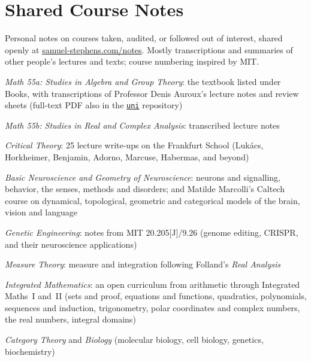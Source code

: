 \documentclass[11pt,letterpaper]{report} %
\begin{document}
    \section*{Shared Course Notes}
    Personal notes on courses taken, audited, or followed out of interest, shared openly at \href{https://www.samuel-stephens.com/notes}{samuel-stephens.com/notes}. Mostly transcriptions and summaries of other people's lectures and texts; course numbering inspired by MIT.
    \begin{tablist}
        \item[2025--26] \tab{}\textit{Math 55a: Studies in Algebra and Group Theory}: the textbook listed under Books, with transcriptions of Professor Denis Auroux's lecture notes and review sheets (full-text PDF also in the \href{https://github.com/sdvstephens/uni}{\texttt{uni}} repository)
        \item[2026]     \tab{}\textit{Math 55b: Studies in Real and Complex Analysis}: transcribed lecture notes
        \item[2026]     \tab{}\textit{Critical Theory}: 25 lecture write-ups on the Frankfurt School (Luk\'acs, Horkheimer, Benjamin, Adorno, Marcuse, Habermas, and beyond)
        \item[2026]     \tab{}\textit{Basic Neuroscience and Geometry of Neuroscience}: neurons and signalling, behavior, the senses, methods and disorders; and Matilde Marcolli's Caltech course on dynamical, topological, geometric and categorical models of the brain, vision and language
        \item[2026]     \tab{}\textit{Genetic Engineering}: notes from MIT 20.205[J]/9.26 (genome editing, CRISPR, and their neuroscience applications)
        \item[ongoing]  \tab{}\textit{Measure Theory}: measure and integration following Folland's \textit{Real Analysis}
        \item[ongoing]  \tab{}\textit{Integrated Mathematics}: an open curriculum from arithmetic through Integrated Maths~I and~II (sets and proof, equations and functions, quadratics, polynomials, sequences and induction, trigonometry, polar coordinates and complex numbers, the real numbers, integral domains)
        \item[ongoing]  \tab{}\textit{Category Theory} and \textit{Biology} (molecular biology, cell biology, genetics, biochemistry)
    \end{tablist}
\end{document}
